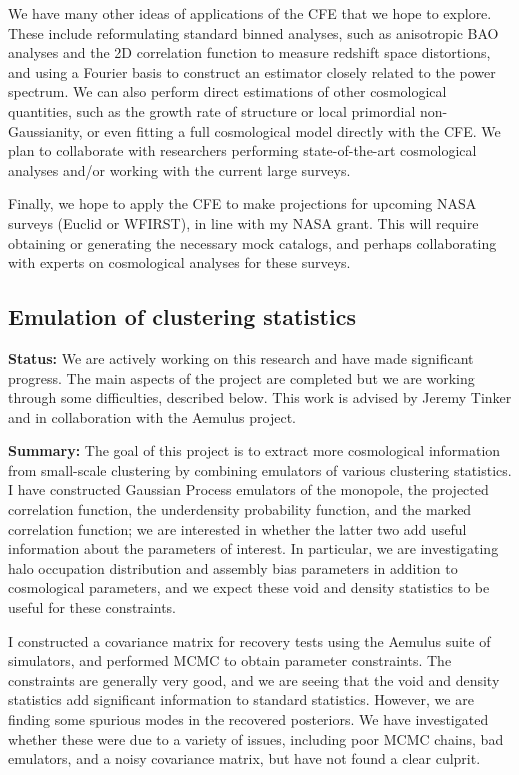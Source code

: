 \documentclass{article}
\begin{document}
We have many other ideas of applications of the CFE that we hope to explore.
These include reformulating standard binned analyses, such as anisotropic BAO analyses and the 2D correlation function to measure redshift space distortions, and using a Fourier basis to construct an estimator closely related to the power spectrum.
We can also perform direct estimations of other cosmological quantities, such as the growth rate of structure or local primordial non-Gaussianity, or even fitting a full cosmological model directly with the CFE.
We plan to collaborate with researchers performing state-of-the-art cosmological analyses and/or working with the current large surveys. 

Finally, we hope to apply the CFE to make projections for upcoming NASA surveys (Euclid or WFIRST), in line with my NASA grant.
This will require obtaining or generating the necessary mock catalogs, and perhaps collaborating with experts on cosmological analyses for these surveys.

\subsection{Emulation of clustering statistics}

\hspace{\parindent} \textbf{Status:}
We are actively working on this research and have made significant progress.
The main aspects of the project are completed but we are working through some difficulties, described below.
This work is advised by Jeremy Tinker and in collaboration with the Aemulus project.

\textbf{Summary:}
The goal of this project is to extract more cosmological information from small-scale clustering by combining emulators of various clustering statistics.
I have constructed Gaussian Process emulators of the monopole, the projected correlation function, the underdensity probability function, and the marked correlation function; we are interested in whether the latter two add useful information about the parameters of interest.
In particular, we are investigating halo occupation distribution and assembly bias parameters in addition to cosmological parameters, and we expect these void and density statistics to be useful for these constraints.

I constructed a covariance matrix for recovery tests using the Aemulus suite of simulators, and performed MCMC to obtain parameter constraints.
The constraints are generally very good, and we are seeing that the void and density statistics add significant information to standard statistics.
However, we are finding some spurious modes in the recovered posteriors.
We have investigated whether these were due to a variety of issues, including poor MCMC chains, bad emulators, and a noisy covariance matrix, but have not found a clear culprit.
\end{document}
